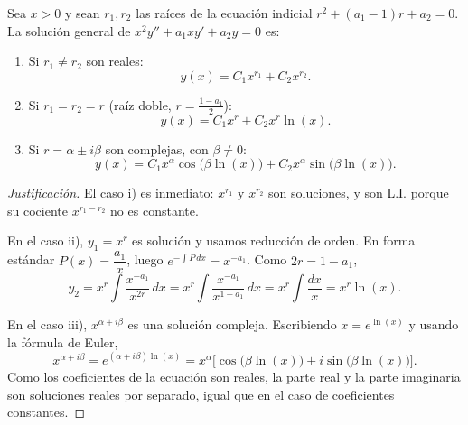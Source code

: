 \begin{theorem}
    Sea $x>0$ y sean $r_1,r_2$ las ra\'ices de la ecuaci\'on indicial $r^2+(a_1-1)r+a_2=0$. La soluci\'on general de $x^2y''+a_1xy'+a_2y=0$ es:
    \begin{enumerate}[label=\roman*)]
        \item Si $r_1\neq r_2$ son reales:
        \[
        y(x)=C_1x^{r_1}+C_2x^{r_2}.
        \]
        \item Si $r_1=r_2=r$ (ra\'iz doble, $r=\frac{1-a_1}{2}$):
        \[
        y(x)=C_1x^{r}+C_2x^{r}\ln(x).
        \]
        \item Si $r=\alpha\pm i\beta$ son complejas, con $\beta\neq0$:
        \[
        y(x)=C_1x^{\alpha}\cos\big(\beta\ln(x)\big)+C_2x^{\alpha}\sin\big(\beta\ln(x)\big).
        \]
    \end{enumerate}
\end{theorem}

\begin{proof}[Justificaci\'on]
    El caso i) es inmediato: $x^{r_1}$ y $x^{r_2}$ son soluciones, y son L.I. porque su cociente $x^{r_1-r_2}$ no es constante.

    En el caso ii), $y_1=x^r$ es soluci\'on y usamos reducci\'on de orden. En forma est\'andar $P(x)=\dfrac{a_1}{x}$, luego $e^{-\int P\,dx}=x^{-a_1}$. Como $2r=1-a_1$,
    \[
    y_2=x^r\int\dfrac{x^{-a_1}}{x^{2r}}\,dx=x^r\int\dfrac{x^{-a_1}}{x^{1-a_1}}\,dx=x^r\int\dfrac{dx}{x}=x^r\ln(x).
    \]

    En el caso iii), $x^{\alpha+i\beta}$ es una soluci\'on compleja. Escribiendo $x=e^{\ln(x)}$ y usando la f\'ormula de Euler,
    \[
    x^{\alpha+i\beta}=e^{(\alpha+i\beta)\ln(x)}=x^{\alpha}\Big[\cos\big(\beta\ln(x)\big)+i\sin\big(\beta\ln(x)\big)\Big].
    \]
    Como los coeficientes de la ecuaci\'on son reales, la parte real y la parte imaginaria son soluciones reales por separado, igual que en el caso de coeficientes constantes.
\end{proof}

